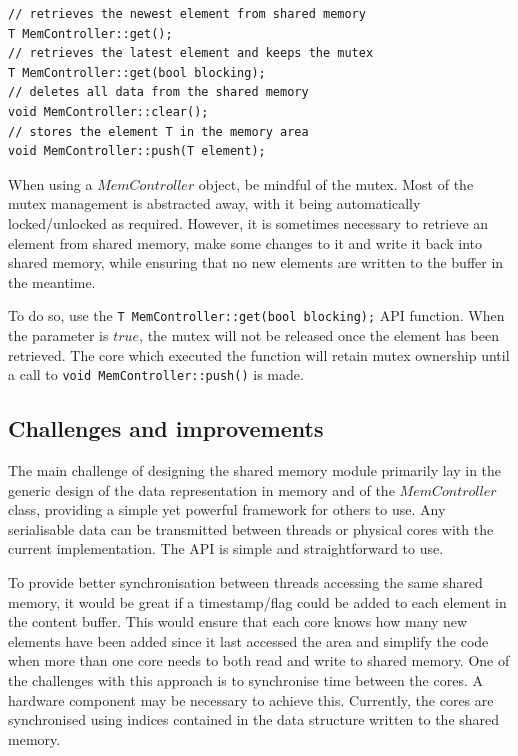 \begin{lstlisting}[caption={The basic $MemController$ API},label={memoryctrl:code_api}]
// retrieves the newest element from shared memory
T MemController::get();
// retrieves the latest element and keeps the mutex
T MemController::get(bool blocking);   
// deletes all data from the shared memory
void MemController::clear();  
// stores the element T in the memory area
void MemController::push(T element);  
\end{lstlisting}

When using a $MemController$ object, be mindful of the mutex. Most of the mutex management is abstracted away, with it being automatically locked/unlocked as required. However, it is sometimes necessary to retrieve an element from shared memory, make some changes to it and write it back into shared memory, while ensuring that no new elements are written to the buffer in the meantime. 

To do so, use the \lstinline!T MemController::get(bool blocking);! API function. When the parameter is $true$, the mutex will not be released once the element has been retrieved. The core which executed the function will retain mutex ownership until a call to \lstinline!void MemController::push()! is made.

\subsection{Challenges and improvements}
The main challenge of designing the shared memory module primarily lay in the generic design of the data representation in memory and of the $MemController$ class, providing a simple yet powerful framework for others to use. Any serialisable data can be transmitted between threads or physical cores with the current implementation. The API is simple and straightforward to use.

To provide better synchronisation between threads accessing the same shared memory, it would be great if a timestamp/flag could be added to each element in the content buffer. This would ensure that each core knows how many new elements have been added since it last accessed the area and simplify the code when more than one core needs to both read and write to shared memory. One of the challenges with this approach is to synchronise time between the cores. A hardware component may be necessary to achieve this. Currently, the cores are synchronised using indices contained in the data structure written to the shared memory. 

